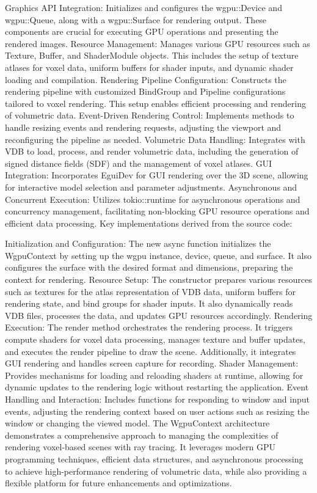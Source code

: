 Graphics API Integration: Initializes and configures the wgpu::Device and wgpu::Queue, along with a wgpu::Surface for rendering output. These components are crucial for executing GPU operations and presenting the rendered images.
Resource Management: Manages various GPU resources such as Texture, Buffer, and ShaderModule objects. This includes the setup of texture atlases for voxel data, uniform buffers for shader inputs, and dynamic shader loading and compilation.
Rendering Pipeline Configuration: Constructs the rendering pipeline with customized BindGroup and Pipeline configurations tailored to voxel rendering. This setup enables efficient processing and rendering of volumetric data.
Event-Driven Rendering Control: Implements methods to handle resizing events and rendering requests, adjusting the viewport and reconfiguring the pipeline as needed.
Volumetric Data Handling: Integrates with VDB to load, process, and render volumetric data, including the generation of signed distance fields (SDF) and the management of voxel atlases.
GUI Integration: Incorporates EguiDev for GUI rendering over the 3D scene, allowing for interactive model selection and parameter adjustments.
Asynchronous and Concurrent Execution: Utilizes tokio::runtime for asynchronous operations and concurrency management, facilitating non-blocking GPU resource operations and efficient data processing.
Key implementations derived from the source code:

Initialization and Configuration: The new async function initializes the WgpuContext by setting up the wgpu instance, device, queue, and surface. It also configures the surface with the desired format and dimensions, preparing the context for rendering.
Resource Setup: The constructor prepares various resources such as textures for the atlas representation of VDB data, uniform buffers for rendering state, and bind groups for shader inputs. It also dynamically reads VDB files, processes the data, and updates GPU resources accordingly.
Rendering Execution: The render method orchestrates the rendering process. It triggers compute shaders for voxel data processing, manages texture and buffer updates, and executes the render pipeline to draw the scene. Additionally, it integrates GUI rendering and handles screen capture for recording.
Shader Management: Provides mechanisms for loading and reloading shaders at runtime, allowing for dynamic updates to the rendering logic without restarting the application.
Event Handling and Interaction: Includes functions for responding to window and input events, adjusting the rendering context based on user actions such as resizing the window or changing the viewed model.
The WgpuContext architecture demonstrates a comprehensive approach to managing the complexities of rendering voxel-based scenes with ray tracing. It leverages modern GPU programming techniques, efficient data structures, and asynchronous processing to achieve high-performance rendering of volumetric data, while also providing a flexible platform for future enhancements and optimizations.



